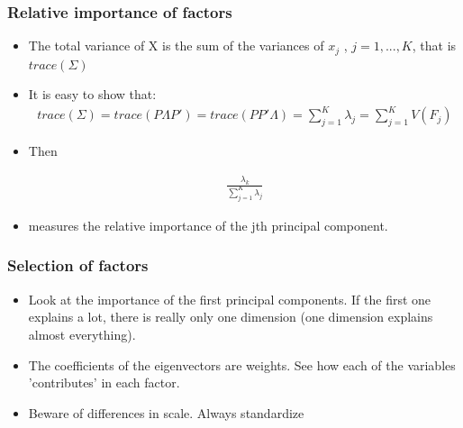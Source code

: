 \documentclass[
  shownotes,
  xcolor={svgnames},
  hyperref={colorlinks,citecolor=DarkBlue,linkcolor=DarkRed,urlcolor=DarkBlue}
  , aspectratio=169]{beamer}
\begin{document}
\begin{frame}
\frametitle{Relative importance of factors}
\begin{itemize}


\item The total variance of X is the sum of the variances of $x_j$ , $j = 1, ..., K$, that is $trace(\Sigma)$
\item It is easy to show that:
\begin{align}
trace(\Sigma) = trace(P \Lambda P')= trace(PP' \Lambda ) = \sum_{j=1}^K \lambda_j= \sum_{j=1}^K V(F_j)
\end{align}
\item Then

\begin{align}
\frac{\lambda_k}{\sum_{j=1}^K \lambda_j}
\end{align}

\item measures the relative importance of the jth principal component.
\end{itemize}
\end{frame}

\begin{frame}
\frametitle{Selection of factors}

\begin{itemize}


\item Look at the importance of the first principal components. If the first one explains a lot, there is really only one dimension (one dimension explains almost everything).
\bigskip
\item The coefficients of the eigenvectors are weights. See how each of the variables 'contributes' in each factor.
\bigskip
\item Beware of differences in scale. Always standardize 
\end{itemize}
\end{frame}
\end{document}
